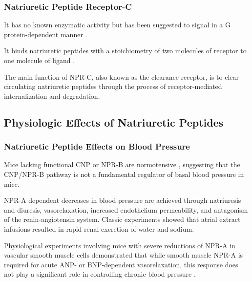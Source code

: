 \documentclass[14pt,a4paper,onecolumn]{extarticle}
\begin{document}
\subsubsection{Natriuretic Peptide Receptor-C}



It has no known enzymatic activity but has been  suggested to signal in a G protein-dependent manner \citep{Rose2008}. %

It binds natriuretic peptides with a stoichiometry of two molecules of receptor to one molecule of ligand \citep{Ammarguellat2001}. %



The main function of NPR-C, also known as the clearance receptor, is to clear circulating natriuretic peptides through the process of receptor-mediated internalization and degradation. %



\subsection{Physiologic Effects of Natriuretic Peptides}





\subsubsection{Natriuretic Peptide Effects on Blood Pressure}



Mice lacking functional CNP or NPR-B are normotensive \citep{Chusho2001} \citep{Tamura2004}, suggesting that the CNP/NPR-B pathway is not a fundamental regulator of basal blood pressure in mice.



NPR-A dependent decreases in blood pressure are achieved through natriuresis and diuresis, vasorelaxation, increased endothelium permeability, and antagonism of the renin-angiotensin system. Classic experiments showed that atrial extract infusions resulted in rapid renal excretion of water and sodium.



Physiological experiments involving mice with severe reductions of NPR-A in vascular smooth muscle cells demonstrated that while smooth muscle NPR-A is required for acute ANP- or BNP-dependent vasorelaxation, this response does not play a significant role in controlling chronic blood pressure \citep{Holtwick2002}.
\end{document}
